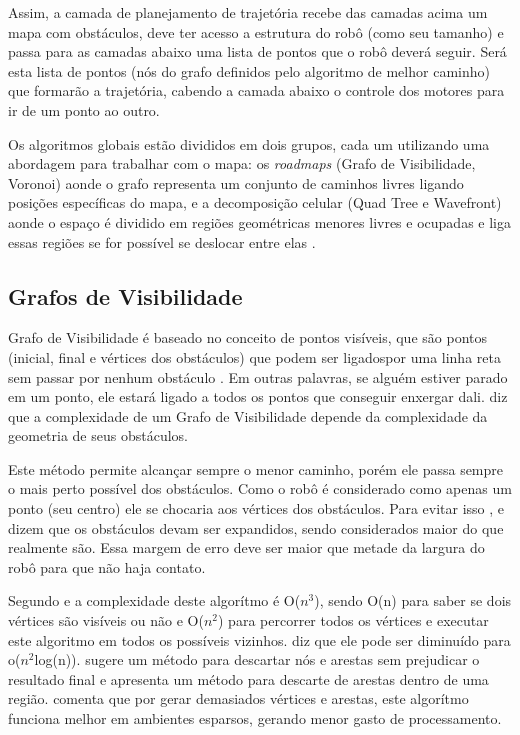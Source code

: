 Assim, a camada de planejamento de trajetória recebe das camadas acima um mapa com obstáculos, deve ter acesso a estrutura do robô (como seu tamanho) e passa para as camadas abaixo uma lista de pontos que o robô deverá seguir. Será esta lista de pontos (nós do grafo definidos pelo algoritmo de melhor caminho) que formarão a trajetória, cabendo a camada abaixo o controle dos motores para ir de um ponto ao outro.

Os algoritmos globais estão divididos em dois grupos, cada um utilizando uma abordagem para trabalhar com o mapa: os \textit{roadmaps} (Grafo de Visibilidade, Voronoi) aonde o grafo representa um conjunto de caminhos livres ligando posições específicas do mapa, e a decomposição celular (Quad Tree e Wavefront) aonde o espaço é dividido em regiões geométricas menores livres e ocupadas e liga essas regiões se for possível se deslocar entre elas \cite{Souza2008}.

\subsection{Grafos de Visibilidade}

Grafo de Visibilidade é baseado no conceito de pontos visíveis, que são pontos (inicial, final e vértices dos obstáculos) que podem ser ligadospor uma linha reta sem passar por nenhum obstáculo \cite{Guzman2008}. Em outras palavras, se alguém estiver parado em um ponto, ele estará ligado a todos os pontos que conseguir enxergar dali. \cite{Souza2008} diz que a complexidade de um Grafo de Visibilidade depende da complexidade da geometria de seus obstáculos.

Este método permite alcançar sempre o menor caminho, porém ele passa sempre o mais perto possível dos obstáculos. Como o robô é considerado como apenas um ponto (seu centro) ele se chocaria aos vértices dos obstáculos. Para evitar isso \cite{Souza2008}, \cite{Siegwart2004} e \cite{Thomsen2010} dizem que os obstáculos devam ser expandidos, sendo considerados maior do que realmente são. Essa margem de erro deve ser maior que metade da largura do robô para que não haja contato.

Segundo \cite{Thomsen2010} e \cite{Choset2005} a complexidade deste algorítmo é O($n^3$), sendo O(n) para saber se dois vértices são visíveis ou não e O($n^2$) para percorrer todos os vértices e executar este algoritmo em todos os possíveis vizinhos. \cite{Thomsen2010} diz que ele pode ser diminuído para o($n^2$log(n)). \cite{Medeiros2011} sugere um método para descartar nós e arestas sem prejudicar o resultado final e \cite{Choset2005} apresenta um método para descarte de arestas dentro de uma região. \cite{Siegwart2004} comenta que por gerar demasiados vértices e arestas, este algorítmo funciona melhor em ambientes esparsos, gerando menor gasto de processamento.

